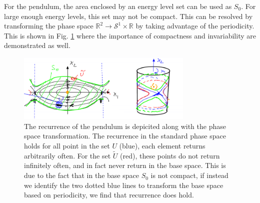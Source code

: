\begin{ex}
	For the pendulum, the area enclosed by an energy level set can be used as $S_0$. For large enough energy levels, this set may not be compact. This can be resolved by transforming the phase space $\mathbb{R}^{2}\to \mathcal{S}^{1}\times \mathbb{R}$ by taking advantage of the periodicity. This is shown in Fig. \ref{fig:pendulum_recurrence} where the importance of compactness and invariability are demonstrated as well.
	\begin{figure}[h!]
		\centering
		\includegraphics[width=0.75\textwidth]{figures/ch8/12pendulum_recurrence.png}
		\caption{The recurrence of the pendulum is depicited along with the phase space transformation. The recurrence in the standard phase space holds for all point in the set $U$ (blue), each element returns arbitrarily often. For the set $\tilde{U}$ (red), these points do not return infinitely often, and in fact never return in the base space. This is due to the fact that in the base space $S_0$ is not compact, if instead we identify the two dotted blue lines to transform the base space based on periodicity, we find that recurrence does hold.}
		\label{fig:pendulum_recurrence}
	\end{figure}
\end{ex}

